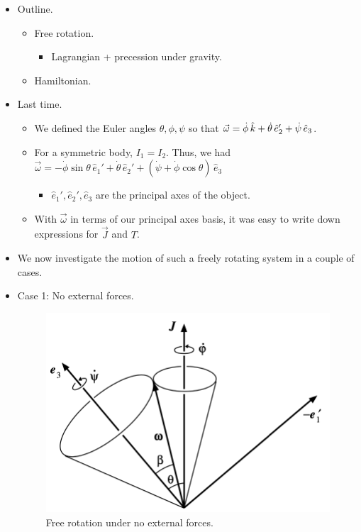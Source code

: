 \documentclass[../notes.tex]{subfiles}
\begin{document}
\begin{itemize}
    \item {}Outline.
    \begin{itemize}
        \item Free rotation.
        \begin{itemize}
            \item Lagrangian + precession under gravity.
        \end{itemize}
        \item Hamiltonian.
    \end{itemize}
    \item Last time.
    \begin{itemize}
        \item We defined the Euler angles $\theta,\phi,\psi$ so that $\vec{\omega}=\dot{\phi}\,\hat{k}+\dot{\theta}\,\hat{e}_2'+\dot{\psi}\,\hat{e}_3$.
        \item For a symmetric body, $I_1=I_2$. Thus, we had $\vec{\omega}=-\dot{\phi}\sin\theta\,\hat{e}_1'+\dot{\theta}\,\hat{e}_2'+(\dot{\psi}+\dot{\phi}\cos\theta)\,\hat{e}_3$
        \begin{itemize}
            \item $\hat{e}_1',\hat{e}_2',\hat{e}_3$ are the principal axes of the object.
        \end{itemize}
        \item With $\vec{\omega}$ in terms of our principal axes basis, it was easy to write down expressions for $\vec{J}$ and $T$.
    \end{itemize}
    \item We now investigate the motion of such a freely rotating system in a couple of cases.
    \item Case 1: No external forces.
    \begin{figure}[h!]
        \centering
        \includegraphics[width=0.43\linewidth]{../ExtFiles/FreeRot1.png}
        \caption{Free rotation under no external forces.}
        \label{fig:FreeRot1}
    \end{figure}
    \begin{itemize}

\end{itemize}
\end{itemize}
\end{document}

